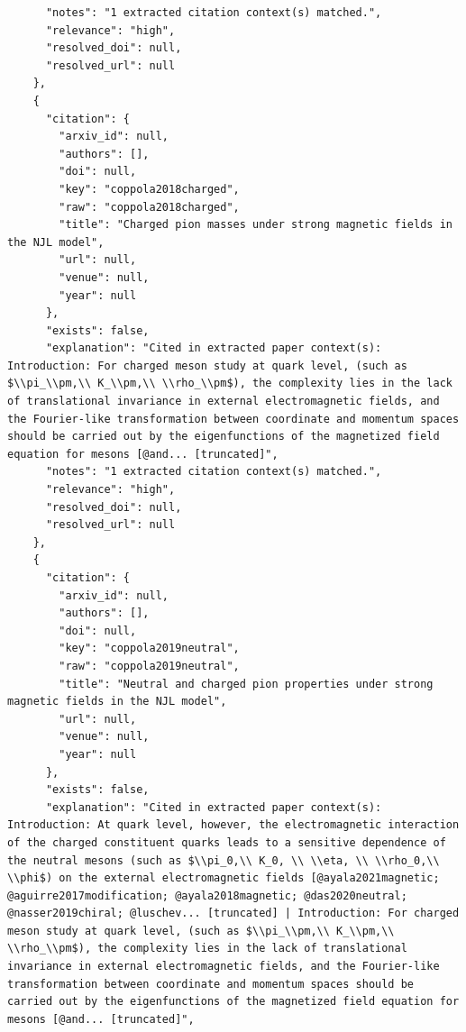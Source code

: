 \documentclass[11pt]{article}
\begin{document}
\begin{verbatim}
      "notes": "1 extracted citation context(s) matched.",
      "relevance": "high",
      "resolved_doi": null,
      "resolved_url": null
    },
    {
      "citation": {
        "arxiv_id": null,
        "authors": [],
        "doi": null,
        "key": "coppola2018charged",
        "raw": "coppola2018charged",
        "title": "Charged pion masses under strong magnetic fields in the NJL model",
        "url": null,
        "venue": null,
        "year": null
      },
      "exists": false,
      "explanation": "Cited in extracted paper context(s): Introduction: For charged meson study at quark level, (such as $\\pi_\\pm,\\ K_\\pm,\\ \\rho_\\pm$), the complexity lies in the lack of translational invariance in external electromagnetic fields, and the Fourier-like transformation between coordinate and momentum spaces should be carried out by the eigenfunctions of the magnetized field equation for mesons [@and... [truncated]",
      "notes": "1 extracted citation context(s) matched.",
      "relevance": "high",
      "resolved_doi": null,
      "resolved_url": null
    },
    {
      "citation": {
        "arxiv_id": null,
        "authors": [],
        "doi": null,
        "key": "coppola2019neutral",
        "raw": "coppola2019neutral",
        "title": "Neutral and charged pion properties under strong magnetic fields in the NJL model",
        "url": null,
        "venue": null,
        "year": null
      },
      "exists": false,
      "explanation": "Cited in extracted paper context(s): Introduction: At quark level, however, the electromagnetic interaction of the charged constituent quarks leads to a sensitive dependence of the neutral mesons (such as $\\pi_0,\\ K_0, \\ \\eta, \\ \\rho_0,\\ \\phi$) on the external electromagnetic fields [@ayala2021magnetic; @aguirre2017modification; @ayala2018magnetic; @das2020neutral; @nasser2019chiral; @luschev... [truncated] | Introduction: For charged meson study at quark level, (such as $\\pi_\\pm,\\ K_\\pm,\\ \\rho_\\pm$), the complexity lies in the lack of translational invariance in external electromagnetic fields, and the Fourier-like transformation between coordinate and momentum spaces should be carried out by the eigenfunctions of the magnetized field equation for mesons [@and... [truncated]",

\end{verbatim}
\end{document}

